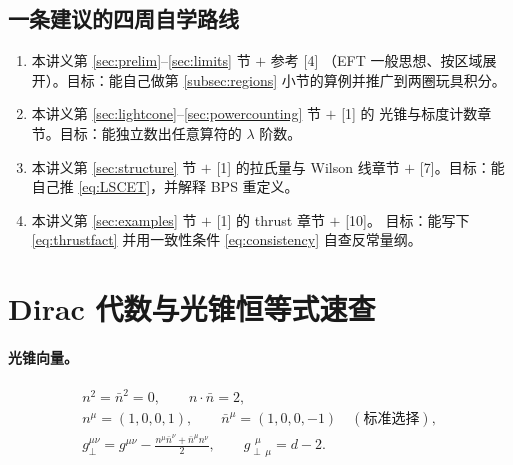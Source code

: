 \documentclass[UTF8,a4paper,11pt]{ctexart}
\theoremstyle{definition}
\theoremstyle{remark}
\theoremstyle{plain}
\begin{document}
\subsection{一条建议的四周自学路线}

\begin{enumerate}[label=\textbf{阶段 \arabic*：}, leftmargin=1.8cm]
  \item 本讲义第 \ref{sec:prelim}--\ref{sec:limits} 节 $+$ 参考 [4]
        （EFT 一般思想、按区域展开）。目标：能自己做第
        \ref{subsec:regions} 小节的算例并推广到两圈玩具积分。
  \item 本讲义第 \ref{sec:lightcone}--\ref{sec:powercounting} 节 $+$ [1] 的
        光锥与标度计数章节。目标：能独立数出任意算符的 $\lambda$ 阶数。
  \item 本讲义第 \ref{sec:structure} 节 $+$ [1] 的拉氏量与 Wilson 线章节
        $+$ [7]。目标：能自己推 \eqref{eq:LSCET}，并解释 BPS 重定义。
  \item 本讲义第 \ref{sec:examples} 节 $+$ [1] 的 thrust 章节 $+$ [10]。
        目标：能写下 \eqref{eq:thrustfact} 并用一致性条件
        \eqref{eq:consistency} 自查反常量纲。
\end{enumerate}

\appendix

\section{Dirac 代数与光锥恒等式速查}
\label{app:identities}

\paragraph{光锥向量。}
\begin{gather}
  n^2=\bar n^2=0,\qquad n\cdot\bar n=2,\\
  n^\mu=(1,0,0,1),\qquad \bar n^\mu=(1,0,0,-1)\quad(\text{标准选择}),\\
  g_\perp^{\mu\nu}=g^{\mu\nu}-\frac{n^\mu\bar n^\nu+\bar n^\mu n^\nu}{2},
  \qquad g_{\perp\,\mu}^{\ \ \mu}=d-2 .
\end{gather}
\end{document}
